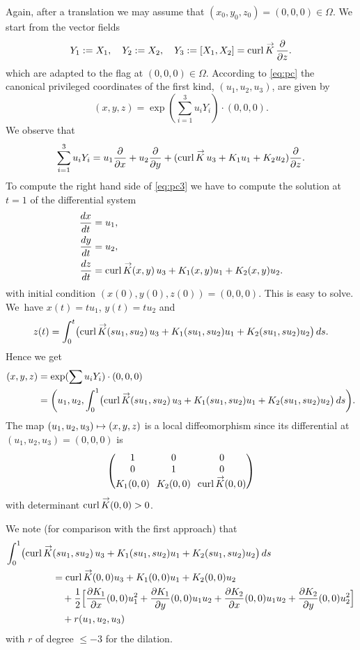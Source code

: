 \documentclass[JEP,XML,SOM,Unicode,published]{cedram}
\newcommand\mto{\mathchoice{\longmapsto}{\mapsto}{\mapsto}{\mapsto}}
\DeclareMathOperator{\curl}{curl}
\renewcommand{\vec}[1]
{\overset{\,{\raisebox{-2pt}{$\scriptstyle\to$}}}{#1}}
\theoremstyle{definition}
\newcommand{\1}{\mathbbm{1}}
\begin{document}
Again, after a translation we may assume that $(x_0,y_0,z_0)= (0,0,0)\in\Omega$.
We start from the vector fields
\[
Y_1:=X_1,\quad
Y_2:=X_2,\quad
Y_3:=[X_1,X_2] = \curl \vec K\,\frac{\partial}{\partial z}.
\]
which are adapted to the flag at $(0,0,0)\in\Omega$. According to \eqref{eq:pc} the canonical privileged coordinates of the first kind, $(u_1,u_2,u_3)$, are given by
\begin{equation}\label{eq:pc3}
(x,y,z)= \exp (\sum_{i=1}^3 u_{i}Y_i) \cdot (0,0,0).
\end{equation}
We observe that
\[
\sum_{i=1}^3 u_{i}Y_i = u_1 \frac{\partial}{\partial x} + u_2 \frac{\partial}{\partial y} +(\curl \vec K\,u_3 + K_1 u_1 + K_2 u_2) \frac{\partial}{\partial z}.
\]
To compute the right hand side of \eqref{eq:pc3} we have to compute the solution at $t=1$ of the differential system
\begin{align*}
\frac{dx}{dt} &=u_1,\\
\frac{dy}{dt} &=u_2, \\
\frac{dz}{dt} &= \curl \vec K (x,y)\,u_3 + K_1(x,y) u_1 + K_2 (x,y)u_2.
\end{align*}
with initial condition $(x(0),y(0),z(0))=(0,0,0)$.
This is easy to solve. We~have $x(t)= tu_1$, $y(t) =t u_2$ and
\[
z(t) = \int_0^t \bigl(\curl \vec K (su_1,su_2)\,u_3 + K_1(su_1,su_2) u_1 + K_2 (su_1,su_2)u_2\bigr)\,ds.
\]
Hence we get
\begin{align*}
(x,y,z) & =\exp (\sum u_{i}Y_i) \cdot (0,0,0)\\
&= \biggl(u_1,u_2, \int_0^1\bigl(\curl \vec K (su_1,su_2)\,u_3 + K_1(su_1,su_2) u_1 + K_2 (su_1,su_2)u_2\bigr) \,ds\biggr).
\end{align*}
The map $(u_1,u_2,u_3) \mto (x,y,z)$ is a local diffeomorphism since its differential at $(u_1,u_2,u_3)=(0,0,0)$ is
\[\arraycolsep3.5pt
\begin{pmatrix}
1&0&0\\
0&1&0\\
K_1(0,0)&K_2(0,0)&\curl \vec K (0,0)
\end{pmatrix}
\]
with determinant $\curl \vec K (0,0)>0$.

We note (for comparison with the first approach) that
\begin{align*}
\int_0^1\bigl(\curl \vec K &(su_1,su_2)\,u_3 + K_1(su_1,su_2) u_1 + K_2 (su_1,su_2)u_2\bigr)\,ds \\
& = \curl \vec K (0,0) u_3 + K_1(0,0) u_1+ K_2(0,0) u_2\\
& \quad
+ \frac12 \Big[ \frac{\partial K_1}{\partial x}(0,0) u_1^2+ \frac{\partial K_1}{\partial y}(0,0) u_1u_2 + \frac{\partial K_2}{\partial x}(0,0) u_1u_2 + \frac{\partial K_2}{\partial y}(0,0) u_2^2\Big]\\
& \quad + r(u_1,u_2,u_3)
\end{align*}
with $r$ of degree $\leq -3$ for the dilation.
\end{document}
